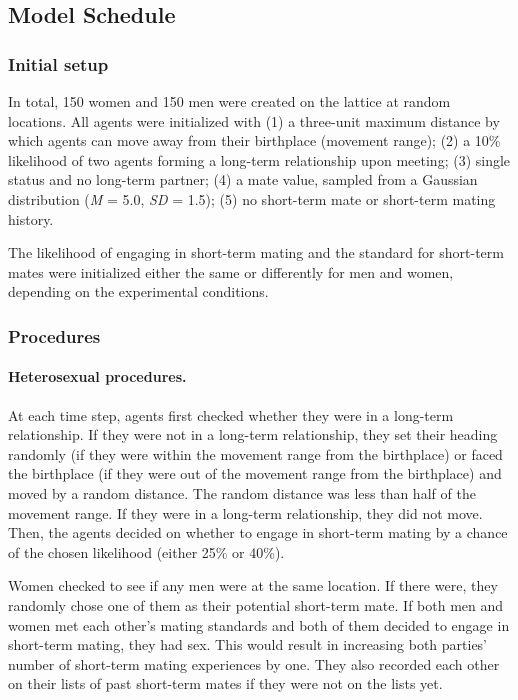 \documentclass[
  11pt,
]{article}
\begin{document}
\hypertarget{model-schedule}{%
\subsection{Model Schedule}\label{model-schedule}}

\hypertarget{initial-setup}{%
\subsubsection{Initial setup}\label{initial-setup}}

In total, 150 women and 150 men were created on the lattice at random
locations. All agents were initialized with (1) a three-unit maximum
distance by which agents can move away from their birthplace (movement
range); (2) a 10\% likelihood of two agents forming a long-term
relationship upon meeting; (3) single status and no long-term partner;
(4) a mate value, sampled from a Gaussian distribution (\emph{M} = 5.0,
\emph{SD} = 1.5); (5) no short-term mate or short-term mating history.

The likelihood of engaging in short-term mating and the standard for
short-term mates were initialized either the same or differently for men
and women, depending on the experimental conditions.

\hypertarget{procedures}{%
\subsubsection{Procedures}\label{procedures}}

\hypertarget{heterosexual-procedures.}{%
\paragraph{Heterosexual procedures.}\label{heterosexual-procedures.}}

At each time step, agents first checked whether they were in a long-term
relationship. If they were not in a long-term relationship, they set
their heading randomly (if they were within the movement range from the
birthplace) or faced the birthplace (if they were out of the movement
range from the birthplace) and moved by a random distance. The random
distance was less than half of the movement range. If they were in a
long-term relationship, they did not move. Then, the agents decided on
whether to engage in short-term mating by a chance of the chosen
likelihood (either 25\% or 40\%).

Women checked to see if any men were at the same location. If there
were, they randomly chose one of them as their potential short-term
mate. If both men and women met each other's mating standards and both
of them decided to engage in short-term mating, they had sex. This would
result in increasing both parties' number of short-term mating
experiences by one. They also recorded each other on their lists of past
short-term mates if they were not on the lists yet.
\end{document}
